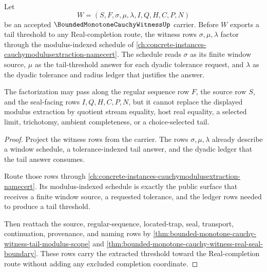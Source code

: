 \begin{theorem}
\label{thm:bounded-monotone-cauchy-witness-cauchy-modulus-extraction-factorization}
Let
$$
W=(S,F,\sigma,\mu,\lambda,I,Q,H,C,P,N)
$$
be an accepted $\BoundedMonotoneCauchyWitnessUp$ carrier. Before $W$ exports a tail threshold to any Real-completion route, the witness rows $\sigma,\mu,\lambda$ factor through the modulus-indexed schedule of \autoref{ch:concrete-instances-cauchymodulusextraction-namecert}. The schedule reads $\sigma$ as its finite window source, $\mu$ as the tail-threshold answer for each dyadic tolerance request, and $\lambda$ as the dyadic tolerance and radius ledger that justifies the answer.

The factorization may pass along the regular sequence row $F$, the source row $S$, and the seal-facing rows $I,Q,H,C,P,N$, but it cannot replace the displayed modulus extraction by quotient stream equality, host real equality, a selected limit, trichotomy, ambient completeness, or a choice-selected tail.
\end{theorem}
\begin{proof}
Project the witness rows from the carrier. The rows $\sigma,\mu,\lambda$ already describe a window schedule, a tolerance-indexed tail answer, and the dyadic ledger that the tail answer consumes.

Route those rows through \autoref{ch:concrete-instances-cauchymodulusextraction-namecert}. Its modulus-indexed schedule is exactly the public surface that receives a finite window source, a requested tolerance, and the ledger rows needed to produce a tail threshold.

Then reattach the source, regular-sequence, located-trap, seal, transport, continuation, provenance, and naming rows by \autoref{thm:bounded-monotone-cauchy-witness-tail-modulus-scope} and \autoref{thm:bounded-monotone-cauchy-witness-real-seal-boundary}. These rows carry the extracted threshold toward the Real-completion route without adding any excluded completion coordinate.
\end{proof}

